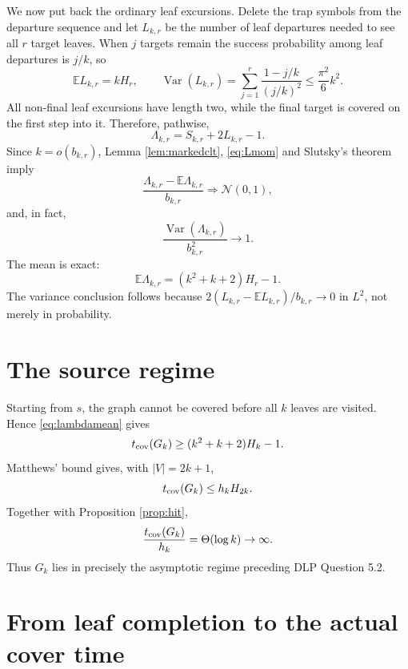 \documentclass[11pt]{article}
\newcommand{\E}{\mathbb E}
\newcommand{\Var}{\operatorname{Var}}
\newcommand{\N}{\mathcal N}
\begin{document}
We now put back the ordinary leaf excursions.  Delete the trap symbols from
the departure sequence and let $L_{k,r}$ be the number of leaf departures
needed to see all $r$ target leaves.  When $j$ targets remain the success
probability among leaf departures is $j/k$, so
\begin{equation}\label{eq:Lmom}
 \E L_{k,r}=kH_r,
 \qquad
 \Var(L_{k,r})
 =\sum_{j=1}^r\frac{1-j/k}{(j/k)^2}
 \le \frac{\pi^2}{6}k^2.
\end{equation}
All non-final leaf excursions have length two, while the final target is
covered on the first step into it.  Therefore, pathwise,
\begin{equation}\label{eq:lambda}
 \Lambda_{k,r}=S_{k,r}+2L_{k,r}-1.
\end{equation}
Since $k=o(b_{k,r})$, Lemma \ref{lem:markedclt}, \eqref{eq:Lmom} and Slutsky's
theorem imply
\begin{equation}\label{eq:lambdaclt}
 \frac{\Lambda_{k,r}-\E\Lambda_{k,r}}{b_{k,r}}
 \Longrightarrow\N(0,1),
\end{equation}
and, in fact,
\begin{equation}\label{eq:lambdavar}
 \frac{\Var(\Lambda_{k,r})}{b_{k,r}^2}\longrightarrow1.
\end{equation}
The mean is exact:
\begin{equation}\label{eq:lambdamean}
 \E\Lambda_{k,r}=(k^2+k+2)H_r-1.
\end{equation}
The variance conclusion follows because
$2(L_{k,r}-\E L_{k,r})/b_{k,r}\to0$ in $L^2$, not merely in probability.

\section{The source regime}

Starting from $s$, the graph cannot be covered before all $k$ leaves are
visited.  Hence \eqref{eq:lambdamean} gives
\[
 t_{\rm cov}(G_k)
 \ge (k^2+k+2)H_k-1.
\]
Matthews' bound gives, with $|V|=2k+1$,
\[
 t_{\rm cov}(G_k)\le h_k H_{2k}.
\]
Together with Proposition \ref{prop:hit},
\begin{equation}\label{eq:regime}
 \frac{t_{\rm cov}(G_k)}{h_k}=\Theta(\log k)\to\infty.
\end{equation}
Thus $G_k$ lies in precisely the asymptotic regime preceding DLP Question 5.2.

\section{From leaf completion to the actual cover time}
\end{document}
